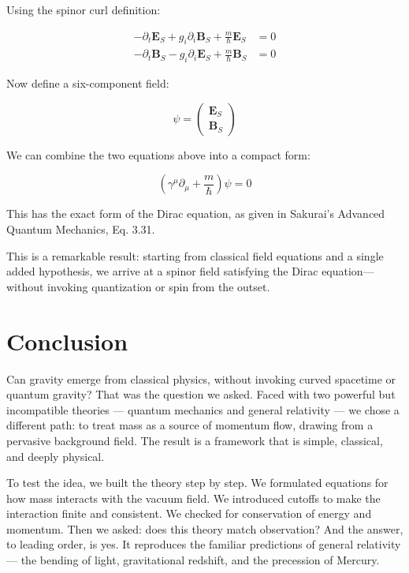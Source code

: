\documentclass {article}
\renewcommand\vec{\mathbf}
\begin{document}
Using the spinor curl definition:

\begin{equation}
\begin{aligned}
-\partial_t \vec{E}_S + g_i \partial_i \vec{B}_S + \frac{m}{\hbar} \vec{E}_S &= 0 \\
-\partial_t \vec{B}_S - g_i \partial_i \vec{E}_S + \frac{m}{\hbar} \vec{B}_S &= 0
\end{aligned}
\end{equation}


Now define a six-component field:

\begin{equation}
\psi = \begin{pmatrix}
\vec{E}_S \\
\vec{B}_S
\end{pmatrix}
\end{equation}

We can combine the two equations above into a compact form:

\begin{equation}
\left( \gamma^\mu \partial_\mu + \frac{m}{\hbar} \right) \psi = 0
\end{equation}

This has the exact form of the Dirac equation, as given in Sakurai’s Advanced Quantum Mechanics, Eq. 3.31.

This is a remarkable result: starting from classical field equations and a single added hypothesis, we arrive at a spinor field satisfying the Dirac equation—without invoking quantization or spin from the outset. 


\section{Conclusion}

Can gravity emerge from classical physics, without invoking curved spacetime or quantum gravity? That was the question we asked. Faced with two powerful but incompatible theories — quantum mechanics and general relativity — we chose a different path: to treat mass as a source of momentum flow, drawing from a pervasive background field. The result is a framework that is simple, classical, and deeply physical.

To test the idea, we built the theory step by step. We formulated equations for how mass interacts with the vacuum field. We introduced cutoffs to make the interaction finite and consistent. We checked for conservation of energy and momentum. Then we asked: does this theory match observation? And the answer, to leading order, is yes. It reproduces the familiar predictions of general relativity — the bending of light, gravitational redshift, and the precession of Mercury.
\end{document}
